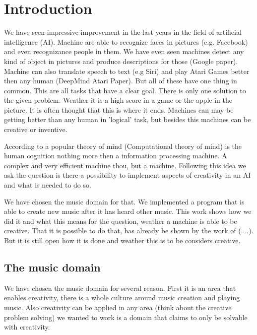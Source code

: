 \section{Introduction} 
We have seen impressive improvement in the last years in the field of artificial intelligence (AI). Machine are able to recognize faces in pictures (e.g. Facebook) and even recognizance people in them. We have even seen machines detect any kind of object in pictures and produce descriptions for those (Google paper). Machine can also translate speech to text (e.g Siri) and play Atari Games better then any human (DeepMind Atari Paper). But all of these have one thing in common. This are all tasks that have a clear goal. There is only one solution to the given problem. Weather it is a high score in a game or the apple in the picture. It is often thought that this is where it ends. Machines can may be getting better than any human in 'logical' task, but besides this machines can be creative or inventive. 

According to a popular theory of mind (Computational theory of mind) 
is the human cognition nothing more then a information processing machine. A complex and very efficient machine thou, but a machine. Following this idea we ask the question is there a possibility to implement aspects of creativity in an AI and what is needed to do so.   

We have chosen the music domain for that. We implemented a program that is able to create new music after it has heard other music. This   work shows how we did it and what this means for the question, weather a machine is able to be creative. That it is possible to do that, has already be shown by the work of (....). But it is still open how it is done and weather this is to be considers creative. 

\subsection{The music domain}
We have chosen the music domain for several reason. First it is an area that enables creativity, there is a whole culture around music creation and playing music. Also creativity can be applied in any area (think about the creative problem solving) we wanted to work is a domain that claims to only be solvable with creativity. 

